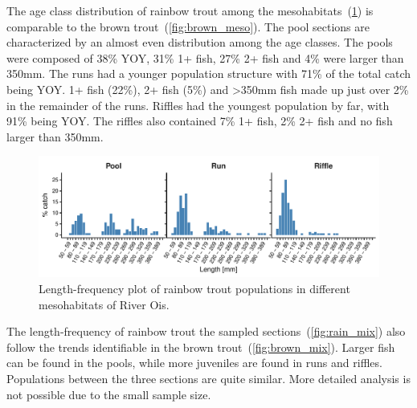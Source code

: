 The age class distribution of rainbow trout among the mesohabitats~(\cref{fig:rain_meso}) is comparable to the brown trout~(\cref{fig:brown_meso}). The pool sections are characterized by an almost even distribution among the age classes. The pools were composed of 38\% YOY, 31\% 1+ fish, 27\% 2+ fish and 4\% were larger than 350mm. The runs had a younger population structure with 71\% of the total catch being YOY. 1+ fish (22\%), 2+ fish (5\%) and \textgreater350mm fish made up just over 2\% in the remainder of the runs. Riffles had the youngest population by far, with 91\% being YOY. The riffles also contained 7\% 1+ fish, 2\% 2+ fish and no fish larger than 350mm.

\begin{figure}[!htb]                              %
	\center
	\includegraphics[width=\textwidth]{images/rain_meso.pdf}                %
	\caption{Length-frequency plot of rainbow trout populations in different mesohabitats of River Ois.}        %
	\label{fig:rain_meso}                                                       %
\end{figure}

The length-frequency of rainbow trout the sampled sections~(\cref{fig:rain_mix}) also follow the trends identifiable in the brown trout~(\cref{fig:brown_mix}). Larger fish can be found in the pools, while more juveniles are found in runs and riffles. Populations between the three sections are quite similar. More detailed analysis is not possible due to the small sample size.

